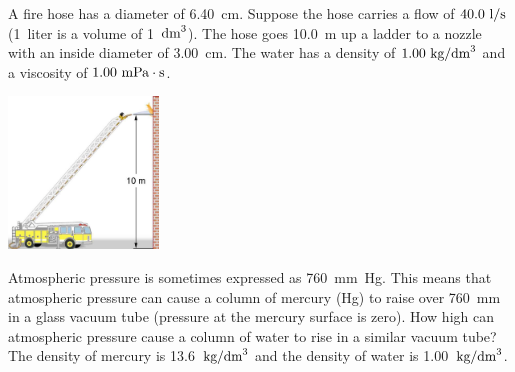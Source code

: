 \documentclass[letterpaper,addpoints,answers]{exam}
\begin{document}
\begin{questions}
\pagebreak

\question
A fire hose has a diameter of 6.40~cm.  Suppose the hose carries a flow of $40.0~\hbox{l}/\hbox{s}$ (1~liter is a volume of 1~$\hbox{dm}^3$).  The hose goes 10.0~m up a ladder to a nozzle with an inside diameter of 3.00~cm.  The water has a density of $1.00~\hbox{kg}/\hbox{dm}^3$ and a viscosity of $1.00~\hbox{mPa}\cdot\hbox{s}$.
\begin{center}
 \includegraphics[width=0.3\textwidth]{test3/firehose}
\end{center}

\question[10]
Atmospheric pressure is sometimes expressed as 760~mm~Hg.  This means that atmospheric pressure can cause a column of mercury (Hg) to raise over 760~mm in a glass vacuum tube (pressure at the mercury surface is zero).  How high can atmospheric pressure cause a column of water to rise in a similar vacuum tube?  The density of mercury is 13.6~$\hbox{kg}/\hbox{dm}^3$ and the density of water is 1.00~$\hbox{kg}/\hbox{dm}^3$.
\vspace{12\baselineskip}

\end{questions}
\end{document}

